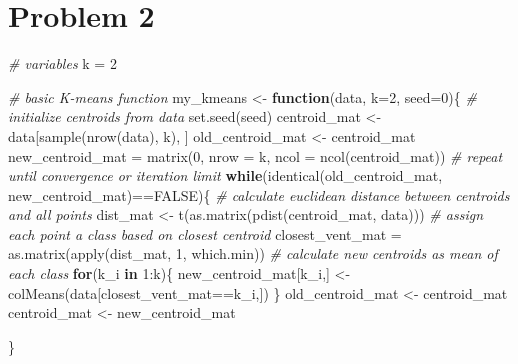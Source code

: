 \documentclass[
  11pt,
]{article}
\newenvironment{Shaded}{\begin{snugshade}}{\end{snugshade}}
\newcommand{\AttributeTok}[1]{\textcolor[rgb]{0.77,0.63,0.00}{#1}}
\newcommand{\CommentTok}[1]{\textcolor[rgb]{0.56,0.35,0.01}{\textit{#1}}}
\newcommand{\ConstantTok}[1]{\textcolor[rgb]{0.00,0.00,0.00}{#1}}
\newcommand{\ControlFlowTok}[1]{\textcolor[rgb]{0.13,0.29,0.53}{\textbf{#1}}}
\newcommand{\DecValTok}[1]{\textcolor[rgb]{0.00,0.00,0.81}{#1}}
\newcommand{\FunctionTok}[1]{\textcolor[rgb]{0.00,0.00,0.00}{#1}}
\newcommand{\NormalTok}[1]{#1}
\newcommand{\OtherTok}[1]{\textcolor[rgb]{0.56,0.35,0.01}{#1}}
\newcommand{\SpecialCharTok}[1]{\textcolor[rgb]{0.00,0.00,0.00}{#1}}
\begin{document}
\hypertarget{problem-2}{%
\section{Problem 2}\label{problem-2}}

\begin{Shaded}
\begin{Highlighting}[]
\CommentTok{\# variables}
\NormalTok{k }\OtherTok{=} \DecValTok{2}

\CommentTok{\# basic K{-}means function}
\NormalTok{my\_kmeans }\OtherTok{\textless{}{-}} \ControlFlowTok{function}\NormalTok{(data, }\AttributeTok{k=}\DecValTok{2}\NormalTok{, }\AttributeTok{seed=}\DecValTok{0}\NormalTok{)\{}
  \CommentTok{\# initialize centroids from data}
  \FunctionTok{set.seed}\NormalTok{(seed)}
\NormalTok{  centroid\_mat }\OtherTok{\textless{}{-}}\NormalTok{ data[}\FunctionTok{sample}\NormalTok{(}\FunctionTok{nrow}\NormalTok{(data), k), ]}
\NormalTok{  old\_centroid\_mat }\OtherTok{\textless{}{-}}\NormalTok{ centroid\_mat}
\NormalTok{  new\_centroid\_mat }\OtherTok{=} \FunctionTok{matrix}\NormalTok{(}\DecValTok{0}\NormalTok{, }\AttributeTok{nrow =}\NormalTok{ k, }\AttributeTok{ncol =} \FunctionTok{ncol}\NormalTok{(centroid\_mat))}
  \CommentTok{\# repeat until convergence or iteration limit}
  \ControlFlowTok{while}\NormalTok{(}\FunctionTok{identical}\NormalTok{(old\_centroid\_mat, new\_centroid\_mat)}\SpecialCharTok{==}\ConstantTok{FALSE}\NormalTok{)\{}
    \CommentTok{\# calculate euclidean distance between centroids and all points}
\NormalTok{    dist\_mat }\OtherTok{\textless{}{-}} \FunctionTok{t}\NormalTok{(}\FunctionTok{as.matrix}\NormalTok{(}\FunctionTok{pdist}\NormalTok{(centroid\_mat, data)))}
    \CommentTok{\# assign each point a class based on closest centroid}
\NormalTok{    closest\_vent\_mat }\OtherTok{=} \FunctionTok{as.matrix}\NormalTok{(}\FunctionTok{apply}\NormalTok{(dist\_mat, }\DecValTok{1}\NormalTok{, which.min))}
    \CommentTok{\# calculate new centroids as mean of each class}
    \ControlFlowTok{for}\NormalTok{(k\_i }\ControlFlowTok{in} \DecValTok{1}\SpecialCharTok{:}\NormalTok{k)\{}
\NormalTok{      new\_centroid\_mat[k\_i,] }\OtherTok{\textless{}{-}} \FunctionTok{colMeans}\NormalTok{(data[closest\_vent\_mat}\SpecialCharTok{==}\NormalTok{k\_i,])}
\NormalTok{    \}}
\NormalTok{    old\_centroid\_mat }\OtherTok{\textless{}{-}}\NormalTok{ centroid\_mat}
\NormalTok{    centroid\_mat }\OtherTok{\textless{}{-}}\NormalTok{ new\_centroid\_mat}
  
\NormalTok{  \}}
  

\end{Highlighting}
\end{Shaded}
\end{document}
